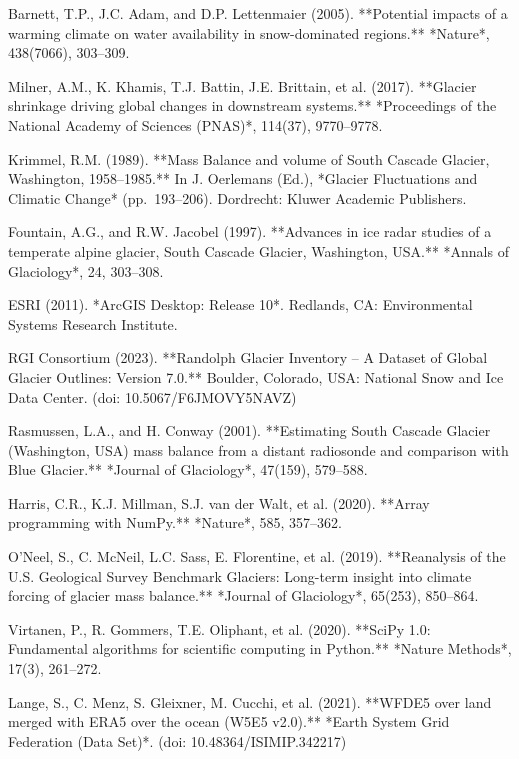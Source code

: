 \documentclass{article}
\begin{document}
\begin{thebibliography}{99}

     Barnett, T.P., J.C. Adam, and D.P. Lettenmaier (2005). **Potential impacts of a warming climate on water availability in snow-dominated regions.** *Nature*, 438(7066), 303–309.
    
     Milner, A.M., K. Khamis, T.J. Battin, J.E. Brittain, et al. (2017). **Glacier shrinkage driving global changes in downstream systems.** *Proceedings of the National Academy of Sciences (PNAS)*, 114(37), 9770–9778.
    
     Krimmel, R.M. (1989). **Mass Balance and volume of South Cascade Glacier, Washington, 1958–1985.** In J. Oerlemans (Ed.), *Glacier Fluctuations and Climatic Change* (pp. 193–206). Dordrecht: Kluwer Academic Publishers.
    
     Fountain, A.G., and R.W. Jacobel (1997). **Advances in ice radar studies of a temperate alpine glacier, South Cascade Glacier, Washington, USA.** *Annals of Glaciology*, 24, 303–308.
    
     ESRI (2011). *ArcGIS Desktop: Release 10*. Redlands, CA: Environmental Systems Research Institute.
    
     RGI Consortium (2023). **Randolph Glacier Inventory – A Dataset of Global Glacier Outlines: Version 7.0.** Boulder, Colorado, USA: National Snow and Ice Data Center. (doi: 10.5067/F6JMOVY5NAVZ)
    
     Rasmussen, L.A., and H. Conway (2001). **Estimating South Cascade Glacier (Washington, USA) mass balance from a distant radiosonde and comparison with Blue Glacier.** *Journal of Glaciology*, 47(159), 579–588.
    
     Harris, C.R., K.J. Millman, S.J. van der Walt, et al. (2020). **Array programming with NumPy.** *Nature*, 585, 357–362.
    
     O’Neel, S., C. McNeil, L.C. Sass, E. Florentine, et al. (2019). **Reanalysis of the U.S. Geological Survey Benchmark Glaciers: Long-term insight into climate forcing of glacier mass balance.** *Journal of Glaciology*, 65(253), 850–864.
    
     Virtanen, P., R. Gommers, T.E. Oliphant, et al. (2020). **SciPy 1.0: Fundamental algorithms for scientific computing in Python.** *Nature Methods*, 17(3), 261–272.
    
     Lange, S., C. Menz, S. Gleixner, M. Cucchi, et al. (2021). **WFDE5 over land merged with ERA5 over the ocean (W5E5 v2.0).** *Earth System Grid Federation (Data Set)*. (doi: 10.48364/ISIMIP.342217)
   

\end{thebibliography}
\end{document}
